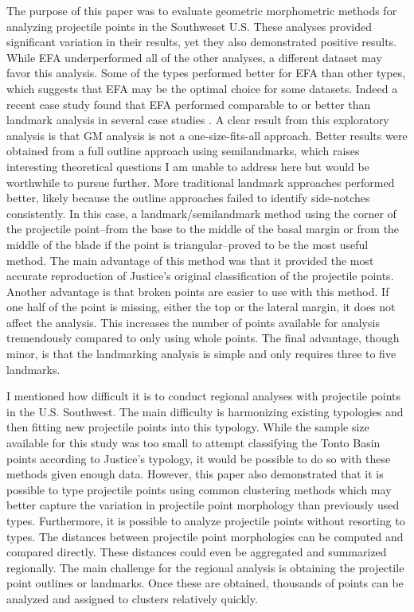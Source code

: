 \documentclass[a4paper]{article}
\begin{document}
The purpose of this paper was to evaluate geometric morphometric methods for analyzing projectile points in the Southweset U.S. These analyses provided significant variation in their results, yet they also demonstrated positive results. While EFA underperformed all of the other analyses, a different dataset may favor this analysis. Some of the types performed better for EFA than other types, which suggests that EFA may be the optimal choice for some datasets. Indeed a recent case study found that EFA performed comparable to or better than landmark analysis in several case studies \autocite{Matzig2021-id}. A clear result from this exploratory analysis is that GM analysis is not a one-size-fits-all approach. Better results were obtained from a full outline approach using semilandmarks, which raises interesting theoretical questions I am unable to address here but would be worthwhile to pursue further. More traditional landmark approaches performed better, likely because the outline approaches failed to identify side-notches consistently. In this case, a landmark/semilandmark method using the corner of the projectile point--from the base to the middle of the basal margin or from the middle of the blade if the point is triangular--proved to be the most useful method. The main advantage of this method was that it provided the most accurate reproduction of Justice's original classification of the projectile points. Another advantage is that broken points are easier to use with this method. If one half of the point is missing, either the top or the lateral margin, it does not affect the analysis. This increases the number of points available for analysis tremendously compared to only using whole points. The final advantage, though minor, is that the landmarking analysis is simple and only requires three to five landmarks.

I mentioned how difficult it is to conduct regional analyses with projectile points in the U.S. Southwest. The main difficulty is harmonizing existing typologies and then fitting new projectile points into this typology. While the sample size available for this study was too small to attempt classifying the Tonto Basin points according to Justice's typology, it would be possible to do so with these methods given enough data. However, this paper also demonstrated that it is possible to type projectile points using common clustering methods which may better capture the variation in projectile point morphology than previously used types. Furthermore, it is possible to analyze projectile points without resorting to types. The distances between projectile point morphologies can be computed and compared directly. These distances could even be aggregated and summarized regionally. The main challenge for the regional analysis is obtaining the projectile point outlines or landmarks. Once these are obtained, thousands of points can be analyzed and assigned to clusters relatively quickly.
\end{document}
